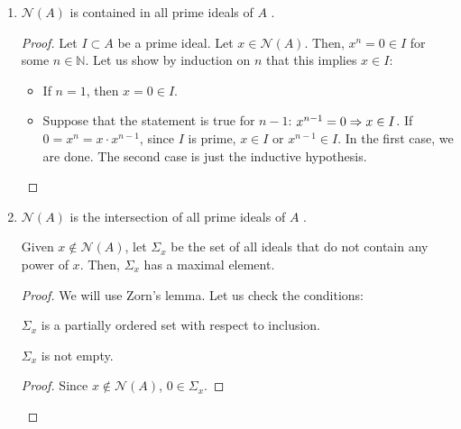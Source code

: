 \begin{problem}
\begin{enumerate}[label=(\theproblem.\arabic*),ref=\theproblem.\arabic*]
        \item \label{itm:nilradical_in_prme} $\mathcal{N}(A)$ is contained in all prime ideals of $A$ .
            \begin{sol}
            \begin{proof}
                Let $I \subset A$ be a prime ideal.
                Let $x \in \mathcal{N}(A)$.
                Then, $x^n = 0 \in I$ for some $n \in \mathbb{N}$.
                Let us show by induction on $n$ that this implies $x \in I$:
                \begin{itemize}
                    \item If $n=1$, then $x = 0 \in I$.
                    \item Suppose that the statement is true for $n-1$: $x^{n-1} = 0 \Rightarrow x \in I$.
                    If $0 = x^n = x \cdot x^{n-1}$,
                    since $I$ is prime, $x \in I$ or $x^{n-1} \in I$.
                    In the first case, we are done.
                    The second case is just the inductive hypothesis.
                \end{itemize}
            \end{proof}
            \end{sol}

        \item \label{itm:nilradical_is_intersection_of_all_primes} $\mathcal{N}(A)$ is the intersection of all prime ideals of $A$ .
            \begin{sol}
                \begin{claim}
                    Given $x \notin \mathcal{N}(A)$, let $\varSigma_x$ be the set of all ideals that do not contain any power of $x$.
                    Then, $\varSigma_x$ has a maximal element.
                    \begin{proof}
                        We will use Zorn's lemma.
                        Let us check the conditions:

                        \begin{claim}
                              $\varSigma_x$ is a partially ordered set with respect to inclusion.
                        \end{claim}

                        \begin{claim}
                            $\varSigma_x$ is not empty.
                            \begin{proof}
                                Since $x \notin \mathcal{N}(A)$, ${0} \in \varSigma_x$.
                            \end{proof}
                        \end{claim}


\end{proof}
\end{claim}
\end{sol}
\end{enumerate}
\end{problem}
